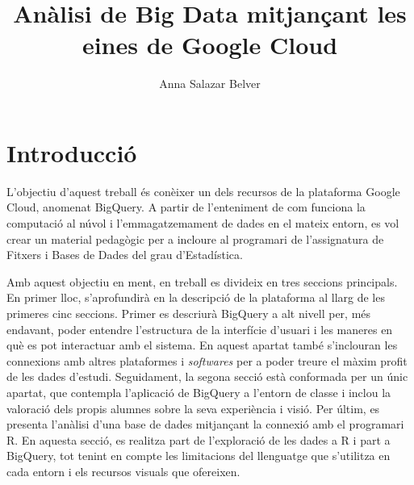 \documentclass[12pt,longbibliography]{article}
\title{Anàlisi de Big Data mitjançant les eines de Google Cloud}
\author{Anna Salazar Belver}
\theoremstyle{definition}
\theoremstyle{remark}
\begin{document}
\begin{titlepage}

\maketitle

\vspace{140mm}

\par
{}%
\hfill
{}%
\par

\end{titlepage}

\tableofcontents

\pagebreak


\section{Introducció}

L'objectiu d'aquest treball és conèixer un dels recursos de la plataforma Google Cloud, anomenat BigQuery. A partir de l'enteniment de com funciona la computació al núvol i l'emmagatzemament de dades en el mateix entorn, es vol crear un material pedagògic per a incloure al programari de l'assignatura de Fitxers i Bases de Dades del grau d'Estadística.

Amb aquest objectiu en ment, en treball es divideix en tres seccions principals. En primer lloc, s'aprofundirà en la descripció de la plataforma al llarg de les primeres cinc seccions. Primer es descriurà BigQuery a alt nivell per, més endavant, poder entendre l'estructura de la interfície d'usuari i les maneres en què es pot interactuar amb el sistema. En aquest apartat també s'inclouran les connexions amb altres plataformes i \emph{softwares} per a poder treure el màxim profit de les dades d'estudi. Seguidament, la segona secció està conformada per un únic apartat, que contempla l'aplicació de BigQuery a l'entorn de classe i inclou la valoració dels propis alumnes sobre la seva experiència i visió. Per últim, es presenta l'anàlisi d'una base de dades mitjançant la connexió amb el programari R. En aquesta secció, es realitza part de l'exploració de les dades a R i part a BigQuery, tot tenint en compte les limitacions del llenguatge que s'utilitza en cada entorn i els recursos visuals que ofereixen. 
\end{document}
